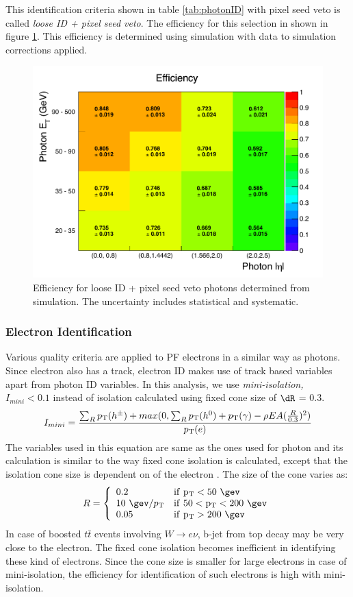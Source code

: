 This identification criteria shown in table \ref{tab:photonID} with pixel seed veto is called \textit{loose ID + pixel seed veto}. The 
efficiency for this selection in shown in figure \ref{fig:PhotonEfficiencies}. This efficiency is determined using simulation with data to 
simulation corrections applied.
\begin{figure}[h!]
\centering
\includegraphics[width=0.7\linewidth]{../Figures/Chap2/PhotonEfficiencies}
\captionsetup{width=.99\linewidth}
\caption[Loose + pixel seed veto photon efficiency]{Efficiency for loose ID + pixel seed veto photons determined from simulation. The 
uncertainty includes statistical and systematic.}
\label{fig:PhotonEfficiencies}
\end{figure}

\subsubsection{Electron Identification}
\label{sec:eleID}
Various quality criteria are applied to PF electrons in a similar way as photons. Since electron also has a track, electron ID makes use 
of track based variables apart from photon ID variables. In this analysis, we use \textit{mini-isolation, $I_{mini}<0.1$} instead of 
isolation calculated using fixed cone size of $\dR$ = 0.3.
\begin{equation}
I_{mini} = \frac{\sum_{R}^{}p_{\mathrm{T}} (h^\pm) + max(0,\sum_{R}^{}p_{\mathrm{T}}(h^0)+p_{\mathrm{T}}(\gamma) - \rho EA (\frac{R}{0.3})^2)}{p_{\mathrm{T}} (e)}
\end{equation}
The variables used in this equation are same as the ones used for photon and its calculation is similar to the way fixed cone isolation 
is calculated, except that the isolation cone size is dependent on \pt of the electron \cite{Rehermann:2010vq}. The size of the cone 
varies as:
\[
R = \left\{
\begin{array}{ll}
0.2\ &\mathrm{if\ \pt < 50\ \gev}\\
10\ \gev /\pt &\mathrm{if\ 50 < \pt < 200\ \gev}\\
0.05 &\mathrm{if\ \pt > 200\ \gev}	
\end{array}
\right.
\]
In case of boosted $t\bar{t}$ events involving $W\to e\nu$, b-jet from top decay may be very close to the electron. The fixed cone isolation 
becomes inefficient in identifying these kind of electrons. Since the cone size is smaller for large \pt electrons in case of 
mini-isolation, the efficiency for identification of such electrons is high with mini-isolation.

